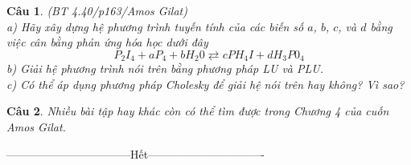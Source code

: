 \documentclass[11pt]{article}
\newtheorem{bt}{Câu}
\begin{document}
\begin{bt} (BT 4.40/p163/Amos Gilat) \\
a) Hãy xây dựng hệ phương trình tuyến tính của các biến số $a$, $b$, $c$, và $d$ bằng việc cân bằng phản ứng hóa học dưới đây
%
\[
P_2I_4 + aP_4+ b H_2 0 \rightleftarrows c PH_4I + d H_3 P 0_4
\]
%
b) Giải hệ phương trình nói trên bằng phương pháp LU và PLU. \\
c) Có thể áp dụng phương pháp Cholesky để giải hệ nói trên hay không? Vì sao?
\end{bt}

\begin{bt}
Nhiều bài tập hay khác còn có thể tìm được trong Chương 4 của cuốn Amos Gilat.
\end{bt}

\centerline{———————————Hết——————————-}
\end{document}
